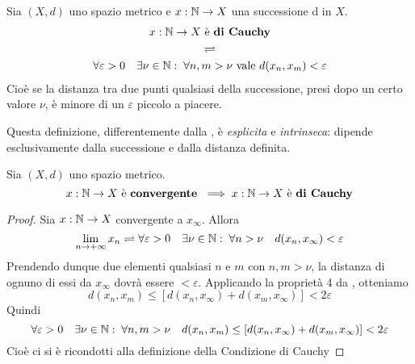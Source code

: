 \begin{definition}
	\label{def:cond_cau}
	Sia $(X,d)$ uno spazio metrico e $x: \mathbb{N} \to X$ una successione d in $X$.
	\begin{equation*}
		\begin{gathered}
			x:\mathbb{N} \to X \text{ è \textbf{di Cauchy}}\\
			\rightleftharpoons\\
			\forall \varepsilon > 0\quad \exists \nu \in \mathbb{N}:\; \forall n,m > \nu \text{ vale } d(x_n, x_m) < \varepsilon
		\end{gathered}
	\end{equation*}
	Cioè se la distanza tra due punti qualsiasi della successione, presi dopo un certo valore $\nu$, è minore di un $\varepsilon$ piccolo a piacere.
	\begin{note}
		Questa definizione, differentemente dalla , è \textit{esplicita} e \textit{intrinseca}: dipende esclusivamente dalla successione e dalla distanza definita.
	\end{note}
\end{definition}
\begin{proposition}
	\label{prop:se_succ_conv_allora_cau}
	Sia $(X,d)$ uno spazio metrico.
	\[x: \mathbb{N} \to X \text{ è \textbf{convergente} } \implies x:\mathbb{N} \to X \text{ è \textbf{di Cauchy}}\]
	\begin{proof}
		Sia $x: \mathbb{N} \to X$ convergente a $x_\infty$. Allora
		\[\lim\limits_{n \to +\infty} x_n \rightleftharpoons \forall\varepsilon > 0 \quad \exists\nu\in\mathbb{N}:\; \forall n > \nu \quad d(x_n,x_\infty)<\varepsilon\]
		Prendendo dunque due elementi qualsiasi $n$ e $m$ con $n,m > \nu$, la distanza di ognuno di essi da $x_\infty$ dovrà essere $<\varepsilon$. Applicando la proprietà 4 da , otteniamo
		\[d(x_n,x_m) \leq \left[ d(x_n,x_\infty)+d(x_m,x_\infty) \right] < 2\varepsilon\]
		Quindi
		\[\forall\varepsilon > 0 \quad \exists\nu\in\mathbb{N}:\; \forall n,m > \nu \quad d(x_n,x_m) \leq \left[ d(x_n,x_\infty)+d(x_m,x_\infty) \right] < 2\varepsilon\]
		Cioè ci si è ricondotti alla definizione della Condizione di Cauchy
	\end{proof}
\end{proposition}

